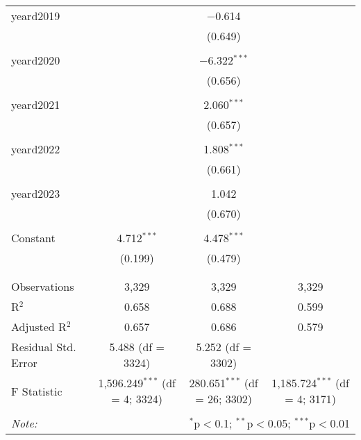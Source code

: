 \begin{table}[!htbp]
\begin{tabular}{@{\extracolsep{5pt}}lccc}
 yeard2019 &  & $-$0.614 &  \\ 
  &  & (0.649) &  \\ 
  & & & \\ 
 yeard2020 &  & $-$6.322$^{***}$ &  \\ 
  &  & (0.656) &  \\ 
  & & & \\ 
 yeard2021 &  & 2.060$^{***}$ &  \\ 
  &  & (0.657) &  \\ 
  & & & \\ 
 yeard2022 &  & 1.808$^{***}$ &  \\ 
  &  & (0.661) &  \\ 
  & & & \\ 
 yeard2023 &  & 1.042 &  \\ 
  &  & (0.670) &  \\ 
  & & & \\ 
 Constant & 4.712$^{***}$ & 4.478$^{***}$ &  \\ 
  & (0.199) & (0.479) &  \\ 
  & & & \\ 
\hline \\[-1.8ex] 
Observations & 3,329 & 3,329 & 3,329 \\ 
R$^{2}$ & 0.658 & 0.688 & 0.599 \\ 
Adjusted R$^{2}$ & 0.657 & 0.686 & 0.579 \\ 
Residual Std. Error & 5.488 (df = 3324) & 5.252 (df = 3302) &  \\ 
F Statistic & 1,596.249$^{***}$ (df = 4; 3324) & 280.651$^{***}$ (df = 26; 3302) & 1,185.724$^{***}$ (df = 4; 3171) \\ 
\hline 
\hline \\[-1.8ex] 
\textit{Note:}  & \multicolumn{3}{r}{$^{*}$p$<$0.1; $^{**}$p$<$0.05; $^{***}$p$<$0.01} \\ 
\end{tabular} 
\end{table} 

